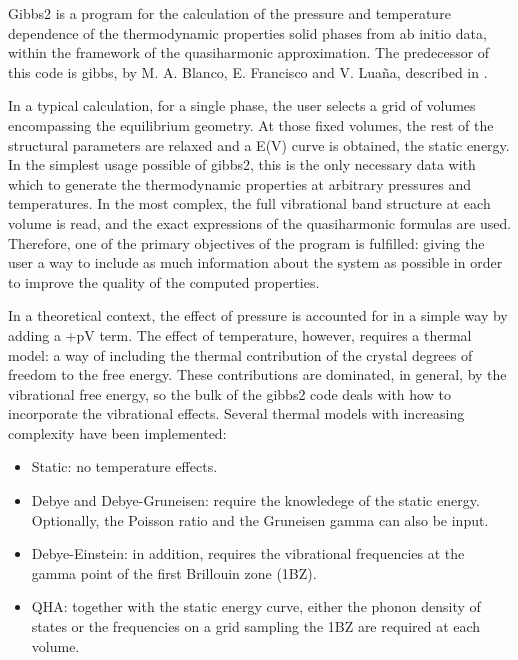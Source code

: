 \documentclass[a4paper]{article}
\begin{document}
Gibbs2 is a program for the calculation of the pressure and
temperature dependence of the thermodynamic properties solid phases
from ab initio data, within the framework of the quasiharmonic
approximation. The predecessor of this code is gibbs, by M. A. Blanco,
E. Francisco and V. Luaña, described in \cite{orig}.

In a typical calculation, for a single phase, the user
selects a grid of volumes encompassing the equilibrium geometry. At
those fixed volumes, the rest of the structural parameters are relaxed
and a E(V) curve is obtained, the static energy. In the simplest usage
possible of gibbs2, this is the only necessary data with which to
generate the thermodynamic properties at arbitrary pressures and
temperatures. In the most complex, the full vibrational band structure
at each volume is read, and the exact expressions of the quasiharmonic
formulas are used. Therefore, one of the primary objectives of the
program is fulfilled: giving the user a way to include as much
information about the system as possible in order to improve the
quality of the computed properties.

In a theoretical context, the effect of pressure is accounted for in a
simple way by adding a +pV term. The effect of temperature, however,
requires a thermal model: a way of including the thermal contribution
of the crystal degrees of freedom to the free energy. These
contributions are dominated, in general, by the vibrational free
energy, so the bulk of the gibbs2 code deals with how to incorporate
the vibrational effects. Several thermal models with increasing
complexity have been implemented:
%
\begin{itemize}

\item Static: no temperature effects.

\item Debye and Debye-Gruneisen: require the knowledege of the static
energy. Optionally, the Poisson ratio and the Gruneisen gamma can
also be input.

\item Debye-Einstein: in addition, requires the vibrational frequencies at
the gamma point of the first Brillouin zone (1BZ).

\item QHA: together with the static energy curve, either the phonon
density of states or the frequencies on a grid sampling the 1BZ are
required at each volume.

\end{itemize}
\end{document}
